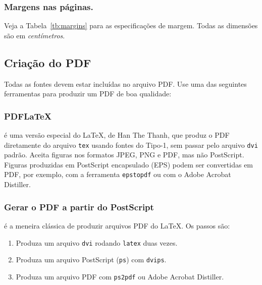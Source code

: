 \subsubsection{Margens nas páginas.} Veja a Tabela~\ref{tb:margins} 
para as especificações de margem. Todas as dimensões são em 
\emph{centímetros}.


\subsection{Criação do PDF}

Todas as fontes devem estar incluídas no arquivo PDF. Use uma das seguintes
ferramentas para produzir um PDF de boa qualidade: 

\subsubsection{PDFLaTeX} 
é uma versão especial do \LaTeX, de Han The
Thanh, que produz o PDF diretamente do arquivo \texttt{tex} usando fontes do Tipo-1,
sem passar pelo arquivo \texttt{dvi} padrão. Aceita figuras nos formatos JPEG, PNG e PDF,
mas não PostScript. Figuras produzidas em PostScript encapsulado (EPS) podem
ser convertidas em PDF, por exemplo, com a ferramenta \texttt{epstopdf} ou
com o Adobe Acrobat
Distiller.



\subsubsection{Gerar o PDF a partir do PostScript} 
é a meneira clássica de produzir arquivos PDF do \LaTeX. Os passos são: 


\begin{enumerate}
  \item Produza um arquivo \texttt{dvi} rodando \texttt{latex} duas vezes. 
  \item Produza um arquivo PostScript (\texttt{ps}) com \texttt{dvips}.
  \item Produza um arquivo PDF com \texttt{ps2pdf} ou Adobe Acrobat
  Distiller.
\end{enumerate}

